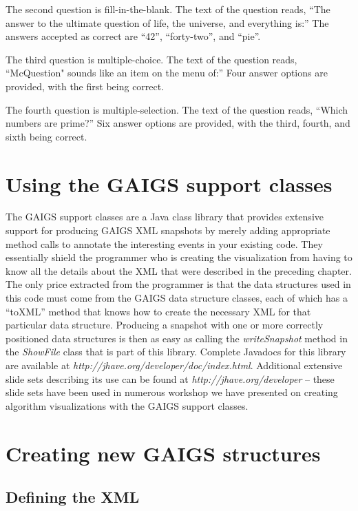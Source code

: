 \documentclass[11pt,letterpaper]{book}
\begin{document}
The second question is fill-in-the-blank. The text of the question
reads, ``The answer to the ultimate question of life, the universe,
and everything is:'' The answers accepted as correct are ``42'',
``forty-two'', and ``pie''.

The third question is multiple-choice. The text of the question reads,
``McQuestion" sounds like an item on the menu of:'' Four answer
options are provided, with the first being correct.

The fourth question is multiple-selection. The text of the question
reads, ``Which numbers are prime?'' Six answer options are provided,
with the third, fourth, and sixth being correct.



\chapter{Using the GAIGS support classes}
\label{gaigs-support-classes}

The GAIGS support classes are a Java class library that provides
extensive support for producing GAIGS XML snapshots by merely adding
appropriate method calls to annotate the interesting events in your
existing code.  They essentially shield the programmer who is creating the
visualization from having to know all the details about the XML that
were described in the preceding chapter.  The only price extracted
from the programmer is that the data structures used in this code must
come from the GAIGS data structure classes, each of which has a
``toXML'' method that knows how to create the necessary XML for that
particular data structure.  Producing a snapshot with one or more
correctly positioned data structures is then as easy as calling the
\textit{writeSnapshot} method in the \textit{ShowFile} class that is
part of this library.  Complete Javadocs for this library are
available at \textit{http://jhave.org/developer/doc/index.html}.
Additional extensive slide sets describing its use can be found at
\textit{http://jhave.org/developer} -- these slide sets have been used
in numerous workshop we have presented on creating algorithm
visualizations with the GAIGS support classes.

\chapter{Creating new GAIGS structures}
\section{Defining the XML}
\label{extending-gaigs}
\end{document}
